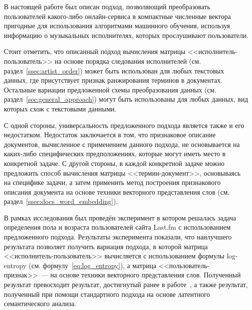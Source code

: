 \startconclusionpage
В настоящей работе был описан подход, позволяющий преобразовать
пользователей какого-либо онлайн-сервиса в компактные
численные вектора пригодные для использования алгоритмами машинного обучения,
используя информацию о музыкальных исполнителях, которых прослушивают
пользователи.

Стоит отметить, что описанный подход вычисления матрицы
<<исполнитель-пользователь>> на основе порядка следования исполнителей (см. 
раздел~\ref{ssec:artist_order}) может быть использован для
любых текстовых данных, где присутствует признак ранжирования
терминов в документах. Остальные вариации предложенной схемы
преобразования данных (см. раздел~\ref{sec:general_approach})
могут быть использованы для любых данных, вид которых схож с
текстовыми данными.

С одной стороны, универсальность предложенного подхода является также
и его недостатком. Недостаток заключается в том, что признаковое
описание документов, вычисленное с применением данного подхода,
не основывается на каких-либо специфических предположениях, которые
могут иметь место в конкретной задаче. С другой стороны, в каждой
конкретной задаче можно предложить способ вычисления матрицы
<<термин-документ>>, основываясь на специфике задачи, а затем
применить метод построения признакового описания документа на
основе техники векторного представления слов (см. 
раздел~\ref{ssec:docs_word_embedding}).

В рамках исследования был проведён эксперимент в котором решалась
задача определения пола и возраста пользователей сайта Last.fm с
использованием предложенного подхода. Результаты эксперимента
показали, что наилучшего результата позволяет получить вариация
подхода, в которой матрица <<исполнитель-пользователь>> вычисляется
с использованием формулы log-entropy (см. формулу~\ref{eq:log_entropy}),
а матрица <<пользователь-признак>>~--- на основе техники векторного
представления слов. Полученный результат превосходит результат,
достигнутый ранее в работе~\cite{wu2014gender}, а также результат,
полученный при помощи стандартного подхода на основе латентного
семантического анализа.

